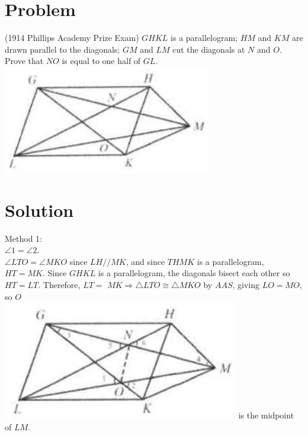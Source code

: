 \documentclass{article}
\begin{document}
\section*{Problem}
(1914 Phillips Academy Prize Exam) \(G H K L\) is a parallelogram; \(H M\) and \(K M\) are drawn parallel to the diagonals; \(G M\) and \(L M\) cut the diagonals at \(N\) and \(O\). Prove that \(N O\) is equal to one half of \(G L\).\\
\centering
\includegraphics[width=\textwidth]{images/044(2).jpg}

\section*{Solution}
Method 1:\\
\(\angle 1=\angle 2\).\\
\(\angle L T O=\angle M K O\) since \(L H / / M K\), and since \(T H M K\) is a parallelogram, \(H T=M K\). Since \(G H K L\) is a parallelogram, the diagonals bisect each other so \(H T=L T\). Therefore, \(L T=\) \(M K \Rightarrow \triangle L T O \cong \triangle M K O\) by \(A A S\), giving \(L O=M O\), so \(O\)\\
\includegraphics[width=\textwidth]{images/048(1).jpg} is the midpoint of \(L M\).
\end{document}
